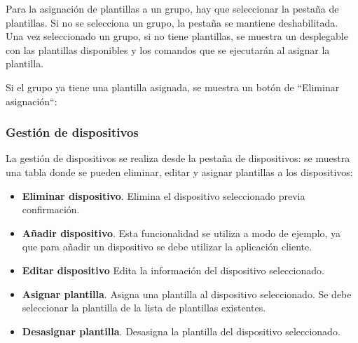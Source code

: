 Para la asignación de plantillas a un grupo, hay que seleccionar la pestaña de plantillas.
Si no se selecciona un grupo, la pestaña se mantiene deshabilitada.
Una vez seleccionado un grupo, si no tiene plantillas, se muestra un desplegable con las plantillas disponibles y
los comandos que se ejecutarán al asignar la plantilla.


Si el grupo ya tiene una plantilla asignada, se muestra un botón de ``Eliminar asignación``:


\subsubsection{Gestión de dispositivos}

La gestión de dispositivos se realiza desde la pestaña de dispositivos: se muestra una tabla donde se pueden eliminar,
editar y asignar plantillas a los dispositivos:





\begin{itemize}
    \item \textbf{Eliminar dispositivo}.
    Elimina el dispositivo seleccionado previa confirmación.
    \item \textbf{Añadir dispositivo}.
    Esta funcionalidad se utiliza a modo de ejemplo, ya que para añadir un dispositivo se debe utilizar la aplicación cliente.
    \item \textbf{Editar dispositivo}
    Edita la información del dispositivo seleccionado.
    \item \textbf{Asignar plantilla}.
    Asigna una plantilla al dispositivo seleccionado.
    Se debe seleccionar la plantilla de la lista de plantillas existentes.
    \item \textbf{Desasignar plantilla}.
    Desasigna la plantilla del dispositivo seleccionado.
\end{itemize}

